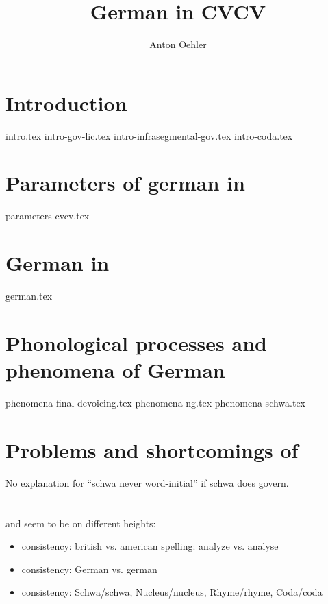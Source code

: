 \documentclass[
]{scrartcl}
\title{German in CVCV}
\author{Anton Oehler}
\begin{document}
\maketitle


\tableofcontents

\section{Introduction}
{intro.tex}
{intro-gov-lic.tex}
{intro-infrasegmental-gov.tex}
{intro-coda.tex}


\section{Parameters of german in \CVCV}
{parameters-cvcv.tex}


\section{German in \CVCV}
{german.tex}


\section{Phonological processes and phenomena of German}
{phenomena-final-devoicing.tex}
{phenomena-ng.tex}
{phenomena-schwa.tex}

\section{Problems and shortcomings of \CVCV}
No explanation for \enquote{schwa never word-initial} if schwa does govern.


\section*{\TODO{}}
\ti{[h]} and \ti{[a]} seem to be on different heights:
\begin{structure}
\end{structure}

\begin{itemize}
\item consistency: british vs. american spelling: analyze vs. analyse
\item consistency: German vs. german
\item consistency: Schwa/schwa, Nucleus/nucleus, Rhyme/rhyme, Coda/coda
\end{itemize}

\printbibliography
\end{document}
